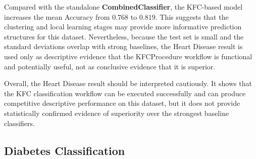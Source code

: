 Compared with the standalone \textbf{CombinedClassifier}, the KFC-based model increases the mean Accuracy from $0.768$ to $0.819$. This suggests that the clustering and local learning stages may provide more informative prediction structures for this dataset. Nevertheless, because the test set is small and the standard deviations overlap with strong baselines, the Heart Disease result is used only as descriptive evidence that the KFCProcedure workflow is functional and potentially useful, not as conclusive evidence that it is superior.

Overall, the Heart Disease result should be interpreted cautiously. It shows that the KFC classification workflow can be executed successfully and can produce competitive descriptive performance on this dataset, but it does not provide statistically confirmed evidence of superiority over the strongest baseline classifiers.

\subsection{Diabetes Classification}

\begin{table}[H]
    \centering
    \caption{Mean Diabetes Classification Results}
    \label{tab:diabetes_aggregated_results}
    \small
\end{table}


